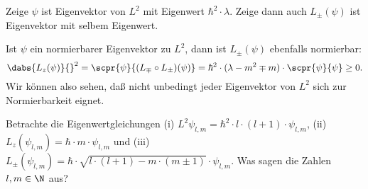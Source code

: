 \documentclass{subfiles}
\begin{document}
        \begin{Aufgabe}
            \nr{} Zeige $\psi$ ist Eigenvektor von $L^2$ mit Eigenwert $\hbar^2\cdot\lambda$. Zeige dann auch $L_\pm(\psi)$ ist Eigenvektor mit selbem Eigenwert. 
        \end{Aufgabe}

        Ist $\psi$ ein normierbarer Eigenvektor zu $L^2$, dann ist $L_\pm(\psi)$ ebenfalls normierbar:
        \[
            \dabs{L_z(\psi)}{}^2 = \scpr{\psi}{(L_\mp\circ L_\pm)(\psi)} = \hbar^2\cdot (\lambda-m^2\mp m)\cdot\scpr{\psi}{\psi} \geq 0.
        \]
        Wir können also sehen, daß nicht unbedingt jeder Eigenvektor von $L^2$ sich zur Normierbarkeit eignet. 

        \begin{Aufgabe}
            \nr{} Betrachte die Eigenwertgleichungen (i) $L^2\psi_{l,m} = \hbar^2\cdot l\cdot(l + 1)\cdot\psi_{l,m}$, (ii) $L_z(\psi_{l,m}) = \hbar\cdot m\cdot \psi_{l,m}$ und (iii) $L_\pm(\psi_{l,m}) = \hbar\cdot\sqrt{l\cdot (l+1) - m\cdot(m\pm 1)}\cdot\psi_{l,m}$. Was sagen die Zahlen $l,m\in\N$ aus?
        \end{Aufgabe}
\end{document}
